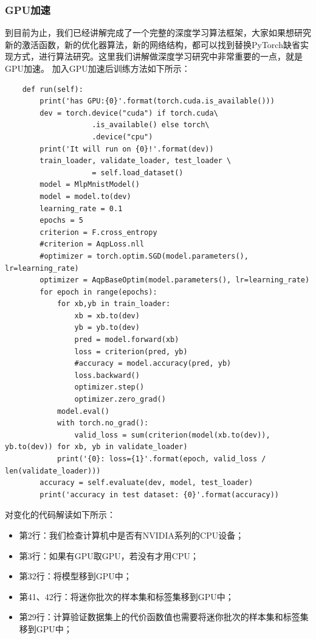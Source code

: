 \documentclass[UTF8]{article}
\begin{document}
\subsubsection{GPU加速}
到目前为止，我们已经讲解完成了一个完整的深度学习算法框架，大家如果想研究新的激活函数，新的优化器算法，新的网络结构，都可以找到替换PyTorch缺省实现方式，进行算法研究。这里我们讲解做深度学习研究中非常重要的一点，就是GPU加速。\newline
加入GPU加速后训练方法如下所示：
\begin{lstlisting}
    def run(self):
        print('has GPU:{0}'.format(torch.cuda.is_available()))
        dev = torch.device("cuda") if torch.cuda\
                    .is_available() else torch\
                    .device("cpu")
        print('It will run on {0}!'.format(dev))
        train_loader, validate_loader, test_loader \
                    = self.load_dataset()
        model = MlpMnistModel()
        model = model.to(dev)
        learning_rate = 0.1
        epochs = 5
        criterion = F.cross_entropy
        #criterion = AqpLoss.nll
        #optimizer = torch.optim.SGD(model.parameters(), lr=learning_rate)
        optimizer = AqpBaseOptim(model.parameters(), lr=learning_rate)
        for epoch in range(epochs):
            for xb,yb in train_loader:
                xb = xb.to(dev)
                yb = yb.to(dev)
                pred = model.forward(xb)
                loss = criterion(pred, yb)
                #accuracy = model.accuracy(pred, yb)
                loss.backward()
                optimizer.step()
                optimizer.zero_grad()
            model.eval()
            with torch.no_grad():
                valid_loss = sum(criterion(model(xb.to(dev)), yb.to(dev)) for xb, yb in validate_loader)
            print('{0}: loss={1}'.format(epoch, valid_loss / len(validate_loader)))
        accuracy = self.evaluate(dev, model, test_loader)
        print('accuracy in test dataset: {0}'.format(accuracy))
\end{lstlisting}
对变化的代码解读如下所示：
\begin{itemize}
\item 第2行：我们检查计算机中是否有NVIDIA系列的CPU设备；
\item 第3行：如果有GPU取GPU，若没有才用CPU；
\item 第32行：将模型移到GPU中；
\item 第41、42行：将迷你批次的样本集和标签集移到GPU中；
\item 第29行：计算验证数据集上的代价函数值也需要将迷你批次的样本集和标签集移到GPU中；
\end{itemize}
\end{document}
